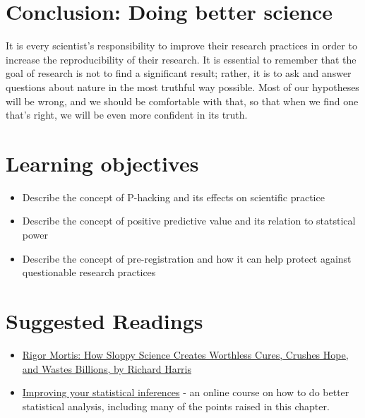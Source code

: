 \documentclass[12pt,]{book}
\providecommand{\tightlist}{%
  \setlength{\itemsep}{0pt}\setlength{\parskip}{0pt}}
\theoremstyle{definition}
\theoremstyle{definition}
\theoremstyle{definition}
\theoremstyle{remark}
\begin{document}
\hypertarget{conclusion-doing-better-science}{%
\section{Conclusion: Doing better science}\label{conclusion-doing-better-science}}

It is every scientist's responsibility to improve their research practices in order to increase the reproducibility of their research. It is essential to remember that the goal of research is not to find a significant result; rather, it is to ask and answer questions about nature in the most truthful way possible. Most of our hypotheses will be wrong, and we should be comfortable with that, so that when we find one that's right, we will be even more confident in its truth.

\hypertarget{learning-objectives-15}{%
\section{Learning objectives}\label{learning-objectives-15}}

\begin{itemize}
\tightlist
\item
  Describe the concept of P-hacking and its effects on scientific practice
\item
  Describe the concept of positive predictive value and its relation to statstical power
\item
  Describe the concept of pre-registration and how it can help protect against questionable research practices
\end{itemize}

\hypertarget{suggested-readings-11}{%
\section{Suggested Readings}\label{suggested-readings-11}}

\begin{itemize}
\tightlist
\item
  \href{https://www.amazon.com/dp/B01K3WN72C}{Rigor Mortis: How Sloppy Science Creates Worthless Cures, Crushes Hope, and Wastes Billions, by Richard Harris}
\item
  \href{https://www.coursera.org/learn/statistical-inferences}{Improving your statistical inferences} - an online course on how to do better statistical analysis, including many of the points raised in this chapter.
\end{itemize}
\end{document}
